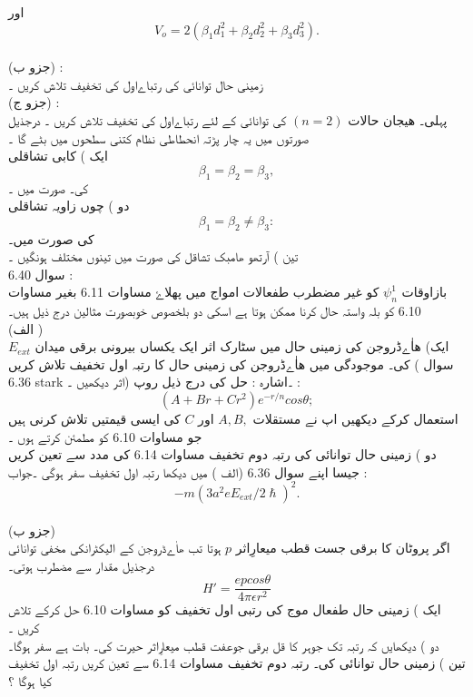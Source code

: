 \documentclass{book}
\begin{document}
اور 
\[V_{o}=2(\beta_{1}d_{1}^{2}+\beta_{2}d_{2}^{2}+\beta_{3}d_{3}^{2}).\]\\
(جزو ب) : \\زمینی حال توانائی کی رتباےاول کی تخفیف تلاش کریں ۔\\
(جزو ج) :\\ پہلی۔ هیجان حالات 
\((n=2)\)
کی توانائی کے لئے رتباےاول کی تخفیف تلاش کریں ۔ درجذیل صورتوں میں یہ چار پڑتہ انحطاطی نظام کتنی سطحوں میں بٹے گا ۔\\
ایک ) کابی تشاقلی
\[\beta_{1}=\beta_{2}=\beta_{3},\]
کی۔ صورت میں ۔\\
دو ) چوں زاویہ تشاقلی
\[\beta_{1}=\beta_{2}\neq\beta_{3}:\]
کی صورت میں۔\\
تین ) آرتھو ھامبک تشاقل کی صورت میں تینوں مختلف ہونگیں ۔\\
سوال 6.40 : \\بازاوقات 
\(\psi_{n}^{1}\)
کو غیر مضطرب طفعالات امواج میں پهلاۓ  مساوات 6.11 بغیر مساوات 6.10 کو بلہ واستہ حال کرنا ممکن ہوتا ہے اسکی دو بلخصوص خوبصورت مثالین درج ذیل ہیں۔\\
(الف )\\
ایک) ھاٰےڈروجن کی زمینی حال میں سٹارک اثر ایک یکساں بیرونی برقی میدان 
\(E_{ext}\)
کی۔ موجودگی میں ھاٰےڈروجن  کی زمینی حال کا رتبہ اول تخفیف تلاش کریں ( سوال 6.36 stark اثر دیکھیں ۔) ۔اشارہ : حل کی درج ذیل روپ :\\
\[(A+Br+Cr^{2})e^{-r/n}cos\theta;\]
استعمال کرکے دیکھیں اپ نے مستقلات 
\(A,B,\)
اور 
\(C\)
کی ایسی قیمتیں تلاش کرنی ہیں جو مساوات 6.10 کو مطمئن کرتے ہوں ۔\\
دو ) زمینی حال توانائی کی رتبہ دوم تخفیف مساوات 6.14 کی مدد سے  تعین کریں جیسا اپنے سوال 6.36 (الف ) میں دیکھا رتبہ اول تخفیف سفر ہوگی ۔جواب :\\
\[-m(3a^{2}eE_{ext}/2\hslash)^{2}.\]\\
(جزو ب)\\ اگر پروٹان کا برقی جست قطب میعارِاثر 
\(p\)
ہوتا تب  ھاٰےڈروجن کے  الیکٹرانکی مخفی توانائی درجذیل مقدار سے مضطرب ہوتی۔
\[H'=\frac{epcos\theta}{4\pi\epsilon r^{2}}\]
ایک ) زمینی حال طفعال موج کی رتبی اول تخفیف کو مساوات 6.10 حل کرکے تلاش کریں ۔\\
دو ) دیکھایں کہ رتبہ تک جوہر کا قل برقی جوعفت قطب میعارِاثر حیرت کی۔ بات ہے سفر ہوگا۔ \\
تین ) زمینی حال توانائی کی۔ رتبہ دوم تخفیف مساوات 6.14 سے تعین کریں رتبہ اول تخفیف کیا ہوگا ؟\\
\\
\end{document}
